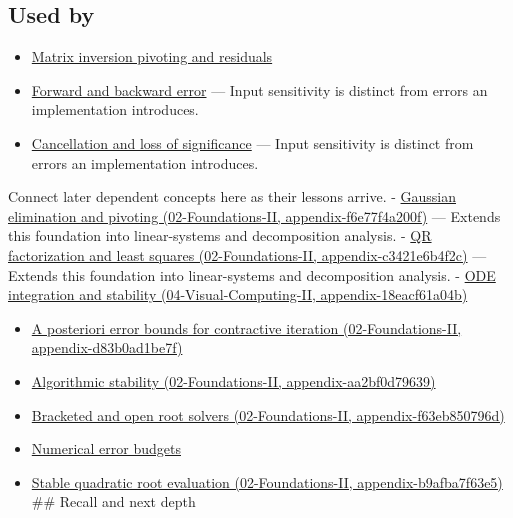 \subsection{Used by}\label{appendix-8f6a01f284a7-used-by}

\begin{itemize}
\item
  \hyperref[appendix-48d2e66378ab]{Matrix inversion pivoting and residuals}
\item
  \hyperref[appendix-a7fbaf6d1b1c]{Forward and backward error} --- Input sensitivity is distinct from errors an implementation introduces.
\item
  \hyperref[appendix-a2773a6a2f9d]{Cancellation and loss of significance} --- Input sensitivity is distinct from errors an implementation introduces.
\end{itemize}

Connect later dependent concepts here as their lessons arrive. - \href{../02-Foundations-II/main.pdf\#nameddest=appendix-f6e77f4a200f}{Gaussian elimination and pivoting (02-Foundations-II, appendix-f6e77f4a200f)} --- Extends this foundation into linear-systems and decomposition analysis. - \href{../02-Foundations-II/main.pdf\#nameddest=appendix-c3421e6b4f2c}{QR factorization and least squares (02-Foundations-II, appendix-c3421e6b4f2c)} --- Extends this foundation into linear-systems and decomposition analysis. - \href{../04-Visual-Computing-II/main.pdf\#nameddest=appendix-18eacf61a04b}{ODE integration and stability (04-Visual-Computing-II, appendix-18eacf61a04b)}

\begin{itemize}
\tightlist
\item
  \href{../02-Foundations-II/main.pdf\#nameddest=appendix-d83b0ad1be7f}{A posteriori error bounds for contractive iteration (02-Foundations-II, appendix-d83b0ad1be7f)}
\item
  \href{../02-Foundations-II/main.pdf\#nameddest=appendix-aa2bf0d79639}{Algorithmic stability (02-Foundations-II, appendix-aa2bf0d79639)}
\item
  \href{../02-Foundations-II/main.pdf\#nameddest=appendix-f63eb850796d}{Bracketed and open root solvers (02-Foundations-II, appendix-f63eb850796d)}
\item
  \hyperref[appendix-31b8c295e05f]{Numerical error budgets}
\item
  \href{../02-Foundations-II/main.pdf\#nameddest=appendix-b9afba7f63e5}{Stable quadratic root evaluation (02-Foundations-II, appendix-b9afba7f63e5)} \#\# Recall and next depth
\end{itemize}

